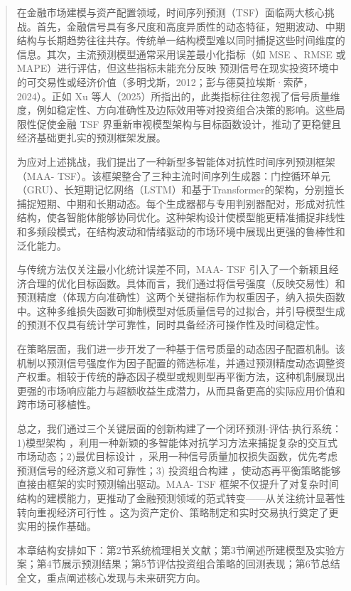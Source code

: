 \begin{quote}
在金融市场建模与资产配置领域，时间序列预测（TSF）面临两大核心挑战。首先，金融信号具有多尺度和高度异质性的动态特征，短期波动、中期结构与长期趋势往往共存。传统单一结构模型难以同时捕捉这些时间维度的信息。其次，主流预测模型通常采用误差最小化指标（如
MSE 、RMSE 或 MAPE）进行评估，但这些指标未能充分反映
预测信号在现实投资环境中的可交易性或经济价值（多明戈斯，2012；彭与德莫拉埃斯·索萨，2024）。正如
Xu
等人（2025）所指出的，此类指标往往忽视了信号质量维度，例如稳定性、方向准确性及边际效用等对投资组合决策的影响。这些局限性促使金融
TSF
界重新审视模型架构与目标函数设计，推动了更稳健且经济基础更扎实的预测框架发展。

为应对上述挑战，我们提出了一种新型多智能体对抗性时间序列预测框架（MAA-
TSF）。该框架整合了三种主流时间序列生成器：门控循环单元（GRU）、长短期记忆网络（LSTM）和基于Transformer的架构，分别擅长捕捉短期、中期和长期动态。每个生成器都与专用判别器配对，形成对抗性结构，使各智能体能够协同优化。这种架构设计使模型能更精准捕捉非线性和多频段模式，在结构波动和情绪驱动的市场环境中展现出更强的鲁棒性和泛化能力。

与传统方法仅关注最小化统计误差不同，MAA- TSF
引入了一个新颖且经济合理的优化目标函数。具体而言，我们通过将信号强度（反映交易性）和预测精度（体现方向准确性）这两个关键指标作为权重因子，纳入损失函数中。这种多维损失函数可抑制模型对低质量信号的过拟合，并引导模型生成的预测不仅具有统计学可靠性，同时具备经济可操作性及时间稳定性。

在策略层面，我们进一步开发了一种基于信号质量的动态因子配置机制。该机制以预测信号强度作为因子配置的筛选标准，并通过预测精度动态调整资产权重。相较于传统的静态因子模型或规则型再平衡方法，这种机制展现出更强的市场响应能力与超额收益生成潜力，从而具备更高的实际应用价值和跨市场可移植性。

总之，我们通过三个关键层面的创新构建了一个闭环预测-评估-执行系统：1)模型架构
，利用一种新颖的多智能体对抗学习方法来捕捉复杂的交互式市场动态；2)最优目标设计
，采用一种信号质量加权损失函数，优先考虑预测信号的经济意义和可靠性；3)
投资组合构建 ，使动态再平衡策略能够直接由框架的实时预测输出驱动。MAA-
TSF
框架不仅提升了对复杂时间结构的建模能力，更推动了金融预测领域的范式转变------从关注统计显著性转向重视经济可行性
。这为资产定价、策略制定和实时交易执行奠定了更实用的操作基础。

本章结构安排如下：第2节系统梳理相关文献；第3节阐述所建模型及实验方案；第4节展示预测结果；第5节评估投资组合策略的回测表现；第6节总结全文，重点阐述核心发现与未来研究方向。
\end{quote}


